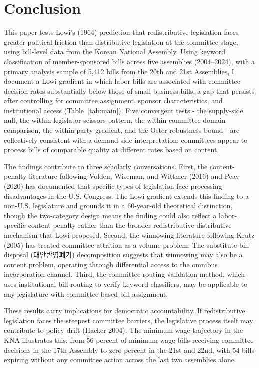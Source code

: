 \documentclass[11pt]{article}
\begin{document}

\section{Conclusion}
\label{sec:conclusion}

This paper tests Lowi's (1964) prediction that redistributive legislation faces greater political friction than distributive legislation at the committee stage, using bill-level data from the Korean National Assembly. Using keyword classification of member-sponsored bills across five assemblies (2004--2024), with a primary analysis sample of 5,412 bills from the 20th and 21st Assemblies, I document a Lowi gradient in which labor bills are associated with committee decision rates substantially below those of small-business bills, a gap that persists after controlling for committee assignment, sponsor characteristics, and institutional access (Table~\ref{tab:main}). Five convergent tests - the supply-side null, the within-legislator scissors pattern, the within-committee domain comparison, the within-party gradient, and the Oster robustness bound - are collectively consistent with a demand-side interpretation: committees appear to process bills of comparable quality at different rates based on content.

The findings contribute to three scholarly conversations. First, the content-penalty literature following Volden, Wiseman, and Wittmer (2016) and Peay (2020) has documented that specific types of legislation face processing disadvantages in the U.S. Congress. The Lowi gradient extends this finding to a non-U.S. legislature and grounds it in a 60-year-old theoretical distinction, though the two-category design means the finding could also reflect a labor-specific content penalty rather than the broader redistributive-distributive mechanism that Lowi proposed. Second, the winnowing literature following Krutz (2005) has treated committee attrition as a volume problem. The substitute-bill disposal (대안반영폐기) decomposition suggests that winnowing may also be a content problem, operating through differential access to the omnibus incorporation channel. Third, the committee-routing validation method, which uses institutional bill routing to verify keyword classifiers, may be applicable to any legislature with committee-based bill assignment.

These results carry implications for democratic accountability. If redistributive legislation faces the steepest committee barriers, the legislative process itself may contribute to policy drift (Hacker 2004). The minimum wage trajectory in the KNA illustrates this: from 56 percent of minimum wage bills receiving committee decisions in the 17th Assembly to zero percent in the 21st and 22nd, with 54 bills expiring without any committee action across the last two assemblies alone.
\end{document}
